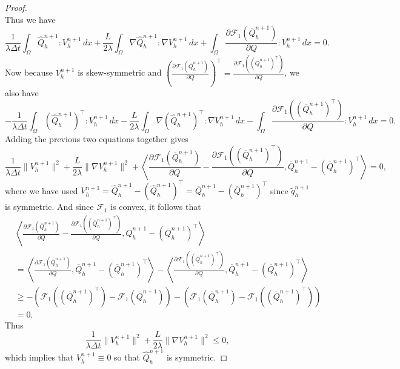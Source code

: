 \documentclass[10pt,a4paper]{amsart}
\begin{document}
\begin{proof}
\[	\]
	Thus we have
	\begin{equation}
	\frac{1}{\lambda\Delta t}\int_\Omega \widehat{Q}_h^{n+1}:V_h^{n+1}\, dx + \frac{L}{2\lambda}\int_\Omega \nabla \widehat{Q}_h^{n+1}: \nabla V_h^{n+1}\, dx + \int_\Omega \frac{\partial \mathcal{F}_1(\overline{Q}_h^{n+1})}{\partial Q}: V_h^{n+1}\, dx = 0.
	\end{equation}
	Now because $V_h^{n+1}$ is skew-symmetric and $\left(\frac{\partial \mathcal{F}_1(\overline{Q}_h^{n+1})}{\partial Q}\right)^\top = \frac{\partial \mathcal{F}_1((\overline{Q}_h^{n+1})^\top)}{\partial Q}$, we also have
	\begin{equation}
	-\frac{1}{\lambda\Delta t}\int_\Omega (\widehat{Q}_h^{n+1})^\top:V_h^{n+1}\, dx - \frac{L}{2\lambda}\int_\Omega \nabla (\widehat{Q}_h^{n+1})^\top: \nabla V_h^{n+1}\, dx - \int_\Omega \frac{\partial \mathcal{F}_1((\overline{Q}_h^{n+1})^\top)}{\partial Q}: V_h^{n+1}\, dx = 0.
	\end{equation}
	Adding the previous two equations together gives
	\begin{equation}
	\frac{1}{\lambda\Delta t}\|V_h^{n+1}\|^2 + \frac{L}{2\lambda}\|\nabla V_h^{n+1}\|^2 + \left\langle \frac{\partial \mathcal{F}_1(\overline{Q}_h^{n+1})}{\partial Q} - \frac{\partial \mathcal{F}_1((\overline{Q}_h^{n+1})^\top)}{\partial Q}, \overline{Q}_h^{n+1} - (\overline{Q}_h^{n+1})^\top\right\rangle = 0,
	\end{equation}
 where we have used $V_h^{n+1} = \widehat{Q}_h^{n+1} - (\widehat{Q}_h^{n+1})^\top = \overline{Q}_h^{n+1} - (\overline{Q}_h^{n+1})^\top$ since $\tilde q_h^{n+1}$ is symmetric.
	And since $\mathcal{F}_1$ is convex, it follows that
	\begin{align*}
	&\left\langle \frac{\partial \mathcal{F}_1(\overline{Q}_h^{n+1})}{\partial Q} - \frac{\partial \mathcal{F}_1((\overline{Q}_h^{n+1})^\top)}{\partial Q}, \overline{Q}_h^{n+1} - (\overline{Q}_h^{n+1})^\top\right\rangle \\
	&= \left\langle \frac{\partial \mathcal{F}_1(\overline{Q}_h^{n+1})}{\partial Q} , \overline{Q}_h^{n+1} - (\overline{Q}_h^{n+1})^\top\right\rangle - \left\langle \frac{\partial \mathcal{F}_1((\overline{Q}_h^{n+1})^\top)}{\partial Q}, \overline{Q}_h^{n+1} - (\overline{Q}_h^{n+1})^\top\right\rangle\\
	&\ge -(\mathcal{F}_1((\overline{Q}_h^{n+1})^\top) - \mathcal{F}_1(\overline{Q}_h^{n+1})) - (\mathcal{F}_1(\overline{Q}_h^{n+1}) - \mathcal{F}_1((\overline{Q}_h^{n+1})^\top))\\
	&= 0.
	\end{align*}
	Thus
	\[
	\frac{1}{\lambda\Delta t} \|V_h^{n+1}\|^2 + \frac{L}{2\lambda}\|\nabla V_h^{n+1}\|^2 \le 0,
	\]
	which implies that $V_h^{n+1} \equiv 0$ so that $\widehat{Q}_h^{n+1}$ is symmetric.
	

\end{proof}
\end{document}
